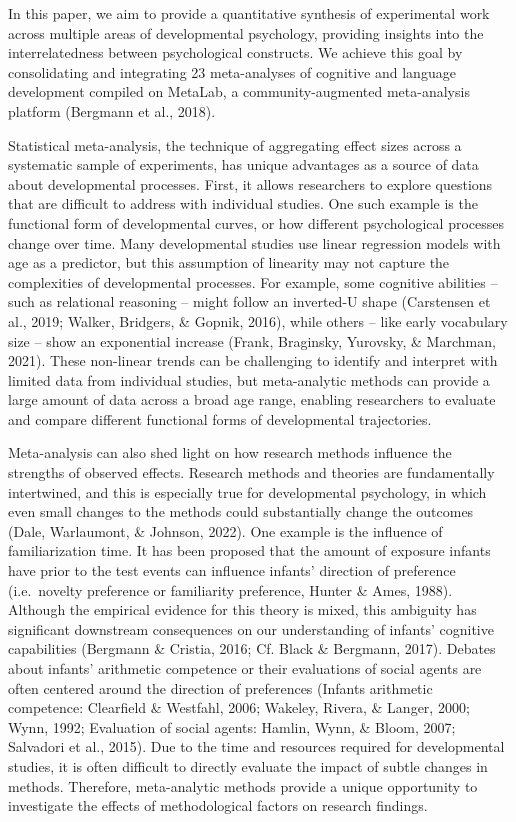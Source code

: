 \documentclass[10pt, letterpaper]{article}
\begin{document}
In this paper, we aim to provide a quantitative synthesis of
experimental work across multiple areas of developmental psychology,
providing insights into the interrelatedness between psychological
constructs. We achieve this goal by consolidating and integrating 23
meta-analyses of cognitive and language development compiled on MetaLab,
a community-augmented meta-analysis platform (Bergmann et al., 2018).

Statistical meta-analysis, the technique of aggregating effect sizes
across a systematic sample of experiments, has unique advantages as a
source of data about developmental processes. First, it allows
researchers to explore questions that are difficult to address with
individual studies. One such example is the functional form of
developmental curves, or how different psychological processes change
over time. Many developmental studies use linear regression models with
age as a predictor, but this assumption of linearity may not capture the
complexities of developmental processes. For example, some cognitive
abilities -- such as relational reasoning -- might follow an inverted-U
shape (Carstensen et al., 2019; Walker, Bridgers, \& Gopnik, 2016),
while others -- like early vocabulary size -- show an exponential
increase (Frank, Braginsky, Yurovsky, \& Marchman, 2021). These
non-linear trends can be challenging to identify and interpret with
limited data from individual studies, but meta-analytic methods can
provide a large amount of data across a broad age range, enabling
researchers to evaluate and compare different functional forms of
developmental trajectories.

Meta-analysis can also shed light on how research methods influence the
strengths of observed effects. Research methods and theories are
fundamentally intertwined, and this is especially true for developmental
psychology, in which even small changes to the methods could
substantially change the outcomes (Dale, Warlaumont, \& Johnson, 2022).
One example is the influence of familiarization time. It has been
proposed that the amount of exposure infants have prior to the test
events can influence infants' direction of preference (i.e.~novelty
preference or familiarity preference, Hunter \& Ames, 1988). Although
the empirical evidence for this theory is mixed, this ambiguity has
significant downstream consequences on our understanding of infants'
cognitive capabilities (Bergmann \& Cristia, 2016; Cf. Black \&
Bergmann, 2017). Debates about infants' arithmetic competence or their
evaluations of social agents are often centered around the direction of
preferences (Infants arithmetic competence: Clearfield \& Westfahl,
2006; Wakeley, Rivera, \& Langer, 2000; Wynn, 1992; Evaluation of social
agents: Hamlin, Wynn, \& Bloom, 2007; Salvadori et al., 2015). Due to
the time and resources required for developmental studies, it is often
difficult to directly evaluate the impact of subtle changes in methods.
Therefore, meta-analytic methods provide a unique opportunity to
investigate the effects of methodological factors on research findings.
\end{document}
